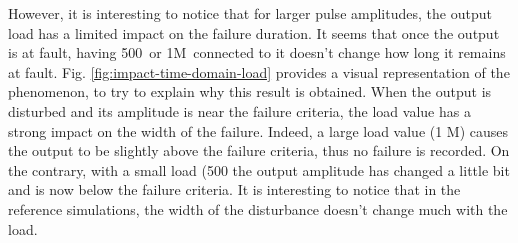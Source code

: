 However, it is interesting to notice that for larger pulse amplitudes, the output load has a limited impact on the failure duration.
It seems that once the output is at fault, having 500\textOmega\ or 1M\textOmega\ connected to it doesn't change how long it remains at fault.
Fig. \ref{fig:impact-time-domain-load} provides a visual representation of the phenomenon, to try to explain why this result is obtained.
When the output is disturbed and its amplitude is near the failure criteria, the load value has a strong impact on the width of the failure.
Indeed, a large load value (1 M\textOmega) causes the output to be slightly above the failure criteria, thus no failure is recorded.
On the contrary, with a small load (500 \textOmega\) the output amplitude has changed a little bit and is now below the failure criteria.
It is interesting to notice that in the reference simulations, the width of the disturbance doesn't change much with the load.


